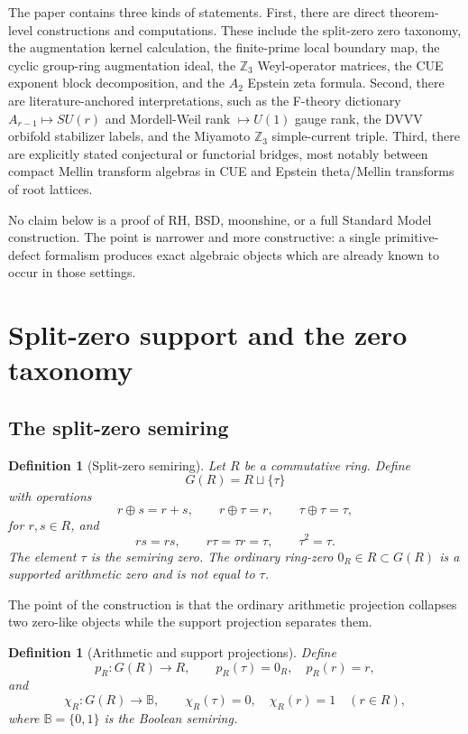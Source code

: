 \documentclass[11pt]{article}
\newtheorem{definition}[theorem]{Definition}
\newcommand{\ZZ}{\mathbb Z}
\newcommand{\BB}{\mathbb B}
\begin{document}
The paper contains three kinds of statements.  First, there are direct theorem-level constructions and computations.  These include the split-zero zero taxonomy, the augmentation kernel calculation, the finite-prime local boundary map, the cyclic group-ring augmentation ideal, the $\ZZ_3$ Weyl-operator matrices, the CUE exponent block decomposition, and the $A_2$ Epstein zeta formula.  Second, there are literature-anchored interpretations, such as the F-theory dictionary $A_{r-1}\mapsto SU(r)$ and Mordell-Weil rank $\mapsto U(1)$ gauge rank, the DVVV orbifold stabilizer labels, and the Miyamoto $\ZZ_3$ simple-current triple.  Third, there are explicitly stated conjectural or functorial bridges, most notably between compact Mellin transform algebras in CUE and Epstein theta/Mellin transforms of root lattices.

No claim below is a proof of RH, BSD, moonshine, or a full Standard Model construction.  The point is narrower and more constructive: a single primitive-defect formalism produces exact algebraic objects which are already known to occur in those settings.

\section{Split-zero support and the zero taxonomy}

\subsection{The split-zero semiring}

\begin{definition}[Split-zero semiring]
Let $R$ be a commutative ring.  Define
\[
        G(R)=R\sqcup\{\tau\}
\]
with operations
\[
        r\oplus s=r+s,\qquad r\oplus\tau=r,\qquad \tau\oplus\tau=\tau,
\]
for $r,s\in R$, and
\[
        rs=rs,\qquad r\tau=\tau r=\tau,
        \qquad \tau^2=\tau.
\]
The element $\tau$ is the semiring zero.  The ordinary ring-zero $0_R\in R\subset G(R)$ is a supported arithmetic zero and is not equal to $\tau$.
\end{definition}

The point of the construction is that the ordinary arithmetic projection collapses two zero-like objects while the support projection separates them.

\begin{definition}[Arithmetic and support projections]
Define
\[
        p_R:G(R)\to R,
        \qquad p_R(\tau)=0_R,\quad p_R(r)=r,
\]
and
\[
        \chi_R:G(R)\to\BB,
        \qquad \chi_R(\tau)=0,
        \quad \chi_R(r)=1\quad(r\in R),
\]
where $\BB=\{0,1\}$ is the Boolean semiring.
\end{definition}
\end{document}
